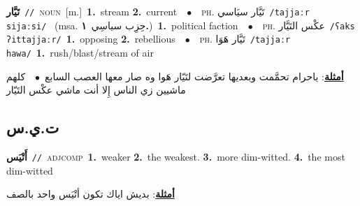 \documentclass[10pt,a4paper,twoside]{article} %
\begin{document}
\begin{multicols}{2}
{\setlength\topsep{0pt}\textbf{\foreignlanguage{arabic}{تَيَّار}}\ {\color{gray}\texttt{//}\color{black}}\ \textsc{noun}\ [m.]\ \textbf{1.}~stream  \textbf{2.}~current\ \ $\bullet$\ \ \textsc{ph.} \color{gray} \foreignlanguage{arabic}{تَيَّار سيَاسي}\color{black}\ {\color{gray}\texttt{/{\sffamily tajjaːr sijaːsi}/}\color{black}}\ \color{gray} (msa. \foreignlanguage{arabic}{حِزِب سياسِي}~\foreignlanguage{arabic}{\textbf{١.}})\color{black}\ \textbf{1.}~political faction\ \ $\bullet$\ \ \textsc{ph.} \color{gray} \foreignlanguage{arabic}{عكْس التَيَّار}\color{black}\ {\color{gray}\texttt{/{\sffamily ʕaks ʔittajjaːr}/}\color{black}}\ \textbf{1.}~opposing  \textbf{2.}~rebellious\ \ $\bullet$\ \ \textsc{ph.} \color{gray} \foreignlanguage{arabic}{تَيَّار هَوَا}\color{black}\ {\color{gray}\texttt{/{\sffamily tajjaːr hawa}/}\color{black}}\ \textbf{1.}~rush/blast/stream of air\  \begin{flushright}\color{gray}\foreignlanguage{arabic}{\textbf{\underline{\foreignlanguage{arabic}{أمثلة}}}: ياحرام تحمَّمت وبعديها تعرَّضت لتَيّار هَوا وه صار معها العصب السابع\ $\bullet$\ \  كلهم ماشيين زي الناس إِلا أنت ماشي عكْس التَيّار}\end{flushright}\color{black}} \vspace{2mm}

\vspace{-3mm}
\subsection*{\color{blue}\foreignlanguage{arabic}{ت.ي.س}\color{blue}{}} 

{\setlength\topsep{0pt}\textbf{\foreignlanguage{arabic}{أَتْيَس}}\ {\color{gray}\texttt{//}\color{black}}\ \textsc{adj\textunderscore comp}\ \textbf{1.}~weaker  \textbf{2.}~the weakest.  \textbf{3.}~more dim-witted.  \textbf{4.}~the most dim-witted\  \begin{flushright}\color{gray}\foreignlanguage{arabic}{\textbf{\underline{\foreignlanguage{arabic}{أمثلة}}}: بديش اياك تكون أتْيَس واحد بالصف}\end{flushright}\color{black}} \vspace{2mm}


\end{multicols}
\end{document}

